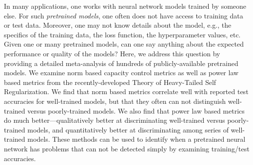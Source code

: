 
In many applications, one works with neural network models trained by someone else.
For such \emph{pretrained models}, one often does not have access to training data or test data.
Moreover, one may not know details about the model, e.g., the specifics of the training data, the loss function, the hyperparameter values, etc.
Given one or many pretrained models, can one say anything about the expected performance or quality of the models?
Here, we address this question by providing a detailed meta-analysis of hundreds of publicly-available pretrained models.
We examine norm based capacity control metrics as well as power law based metrics from the recently-developed Theory of Heavy-Tailed Self Regularization.
We find that norm based metrics correlate well with reported test accuracies for well-trained models, but that they often can not distinguish well-trained versus poorly-trained models.
We also find that power law based metrics do much better---qualitatively better at discriminating well-trained versus poorly-trained models, and quantitatively better at discriminating among series of well-trained models.
These methods can be used to identify when a pretrained neural network has problems that can not be detected simply by examining training/test accuracies.



